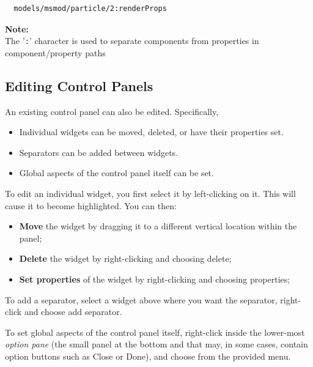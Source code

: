 \documentclass{article}
\begin{document}
\begin{verbatim}
  models/msmod/particle/2:renderProps
\end{verbatim}

\begin{sideblock}
{\bf Note:}\\ 
The '{\tt :}' character is used to separate components from
properties in component/property paths
\end{sideblock}

\subsection{Editing Control Panels}

An existing control panel can also be edited. Specifically,

\begin{itemize}

\item Individual widgets can be moved, deleted, or have their properties
set.

\item Separators can be added between widgets.

\item Global aspects of the control panel itself can be set.

\end{itemize}

To edit an individual widget, you first select it by left-clicking on
it. This will cause it to become highlighted. You can then:

\begin{itemize}

\item {\bf Move} the widget by dragging it to a different vertical location
within the panel;

\item {\bf Delete} the widget by right-clicking and choosing {\sf delete};

\item {\bf Set properties} of the widget by right-clicking and choosing
{\sf properties};

\end{itemize}

To add a separator, select a widget above where you want the
separator, right-click and choose {\sf add separator}.

To set global aspects of the control panel itself, right-click
inside the lower-most {\it option pane} (the small panel at the
bottom and that may, in some cases, contain option buttons such as {\sf Close}
or {\sf Done}), and choose from the provided menu.
\end{document}
